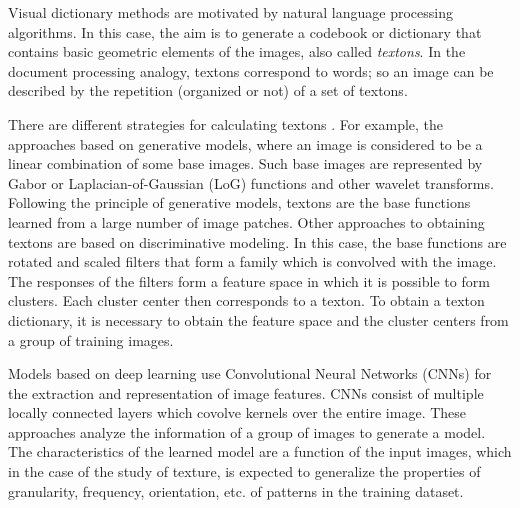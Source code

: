 Visual dictionary methods are motivated by natural language processing algorithms. In this case, the aim is to generate a codebook or dictionary that contains basic geometric elements of the images, also called \textit{textons}. In the document processing analogy, textons correspond to words; so an image can be described by the repetition (organized or not) of a set of textons.

There are different strategies for calculating textons \citep{Zhu.Guo.ea:IJCV:2005}. For example, the approaches based on generative models, where an image is considered to be a linear combination of some base images. Such base images are represented by Gabor or Laplacian-of-Gaussian (LoG) functions and other wavelet transforms. Following the principle of generative models, textons are the base functions learned from a large number of image patches.
Other approaches to obtaining textons are based on discriminative modeling. In this case, the base functions are rotated and scaled filters that form a family which is convolved with the image. The responses of the filters form a feature space  in which it is possible to form clusters. Each cluster center then corresponds to a texton. To obtain a texton dictionary, it is necessary to obtain the feature space and the cluster centers from a group of training images.

Models based on deep learning use Convolutional Neural Networks (CNNs) for the extraction and representation of image features. CNNs consist of multiple locally connected layers which covolve kernels over the entire image. These approaches analyze the information of a group of images to generate a model. The characteristics of the learned model are a function of the input images, which in the case of the study of texture, is expected to generalize the properties of granularity, frequency, orientation, etc. of patterns in the training dataset.



